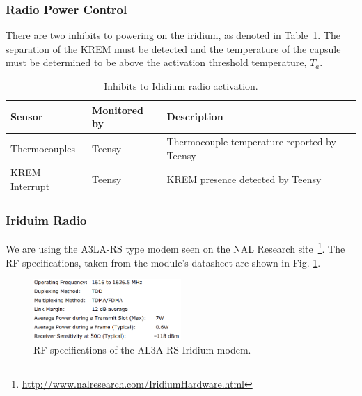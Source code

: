 \documentclass{article}
\begin{document}
\subsubsection{Radio Power Control}
\label{sec:radio-power-control}
There are two inhibits to powering on the iridium, as denoted in Table~\ref{tab:radio-inhibits}. The separation of the KREM must be detected and the temperature of the capsule must be determined to be above the activation threshold temperature, $T_a$.


\begin{table}[H]
	\caption{Inhibits to Ididium radio activation.}
	\label{tab:radio-inhibits}
	\centering
	\begin{tabular}{l|l|l}
		Sensor & Monitored by     &  Description  \\
		\hline
		
		Thermocouples & Teensy  & Thermocouple temperature reported by Teensy\\
		KREM Interrupt	 & Teensy  & KREM presence detected by Teensy
	\end{tabular}
	
\end{table}



\subsubsection{Iriduim Radio}
We are using the A3LA-RS type modem seen on the NAL Research site~\footnote{ \url{http://www.nalresearch.com/IridiumHardware.html}}. The RF specifications, taken from the module's datasheet are shown in Fig. \ref{fig:iridium-rf-specs}.

\begin{figure}[H]
    \centering
    \includegraphics[width=0.5\textwidth]{images/iridium-rf-specs.png}
    \caption{RF specifications of the AL3A-RS Iridium modem.}
    \label{fig:iridium-rf-specs}
\end{figure}
\end{document}
